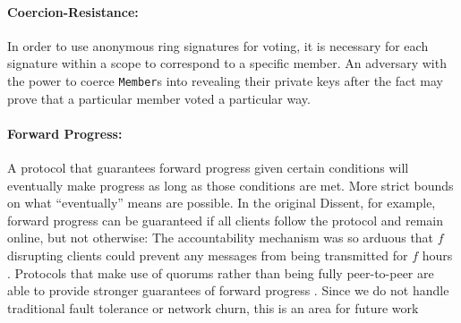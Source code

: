   \paragraph{Coercion-Resistance:} In order to use anonymous ring signatures for
  voting, it is necessary for each signature within a scope to correspond to a
  specific member. An adversary with the power to coerce \texttt{Member}s into
  revealing their private keys after the fact may prove that a particular member
  voted a particular way\cite{lrs}.
  \paragraph{Forward Progress:} A protocol that guarantees forward progress
  given certain conditions will eventually make progress as long as those
  conditions are met. More strict bounds on what ``eventually'' means are
  possible. In the original Dissent, for example, forward progress can be
  guaranteed if all clients follow the protocol and remain online, but not
  otherwise: The accountability mechanism was so arduous that $f$ disrupting
  clients could prevent any messages from being transmitted for $f$ hours
  \cite{verdict}. Protocols that make use of quorums
  rather than being fully peer-to-peer are able to provide stronger guarantees
  of forward progress \cite{paxos}. Since we do not handle traditional fault
  tolerance or network churn,  this is an area
  for future work 
